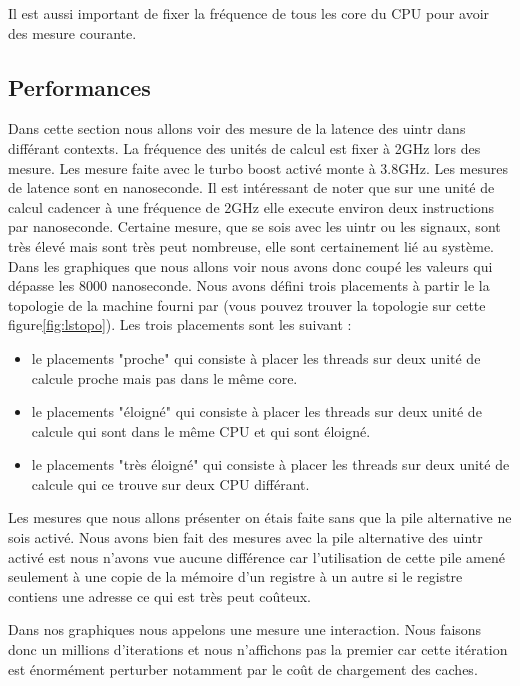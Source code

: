 Il est aussi important de fixer la fréquence de tous les core du CPU pour avoir des mesure courante.

\subsection{Performances}
\label{sec:performance}

Dans cette section nous allons voir des mesure de la latence des uintr dans différant contexts.
La fréquence des unités de calcul est fixer à 2GHz lors des mesure.
Les mesure faite avec le turbo boost activé monte à 3.8GHz.
Les mesures de latence sont en nanoseconde.
Il est intéressant de noter que sur une unité de calcul cadencer à une fréquence de 2GHz elle execute environ deux instructions par nanoseconde. %
Certaine mesure, que se sois avec les uintr ou les signaux, sont très élevé mais sont très peut nombreuse, elle sont certainement lié au système.
Dans les graphiques que nous allons voir nous avons donc coupé les valeurs qui dépasse les 8000 nanoseconde.
Nous avons défini trois placements à partir le la topologie de la machine fourni par \atos{} (vous pouvez trouver la topologie sur cette figure\ref{fig:lstopo}).
Les trois placements sont les suivant :
\begin{itemize}
  \item le placements "proche" qui consiste à placer les threads sur deux unité de calcule proche mais pas dans le même core.
  \item le placements "éloigné" qui consiste à placer les threads sur deux unité de calcule qui sont dans le même CPU et qui sont éloigné.
  \item le placements "très éloigné" qui consiste à placer les threads sur deux unité de calcule qui ce trouve sur deux CPU différant.
\end{itemize}

Les mesures que nous allons présenter on étais faite sans que la pile alternative ne sois activé.
Nous avons bien fait des mesures avec la pile alternative des uintr activé est nous n'avons vue aucune différence car l'utilisation de cette pile
amené seulement à une copie de la mémoire d'un registre à un autre si le registre contiens une adresse ce qui est très peut coûteux.

Dans nos graphiques nous appelons une mesure une interaction.
Nous faisons donc un millions d'iterations et nous n'affichons pas la premier car cette itération est énormément perturber notamment par le coût de chargement des caches.

